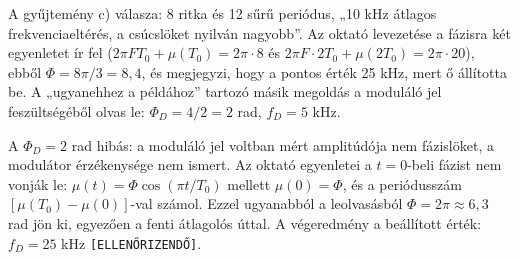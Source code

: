 \begin{tipp}
A gyűjtemény c) válasza: 8 ritka és 12 sűrű periódus, „10 kHz átlagos frekvenciaeltérés, a csúcslöket nyilván nagyobb”. Az oktató levezetése a fázisra két egyenletet ír fel ($2\pi FT_0+\mu(T_0)=2\pi\cdot8$ és $2\pi F\cdot2T_0+\mu(2T_0)=2\pi\cdot20$), ebből $\Phi=8\pi/3=8{,}4$, és megjegyzi, hogy a pontos érték 25 kHz, mert ő állította be. A „ugyanehhez a példához” tartozó másik megoldás a moduláló jel feszültségéből olvas le: $\Phi_D=4/2=2$ rad, $f_D=5$ kHz.
\end{tipp}
\begin{figyelem}[Javítás]
A $\Phi_D=2$ rad hibás: a moduláló jel voltban mért amplitúdója nem fázislöket, a modulátor érzékenysége nem ismert. Az oktató egyenletei a $t=0$-beli fázist nem vonják le: $\mu(t)=\Phi\cos(\pi t/T_0)$ mellett $\mu(0)=\Phi$, és a periódusszám $[\mu(T_0)-\mu(0)]$-val számol. Ezzel ugyanabból a leolvasásból $\Phi=2\pi\approx6{,}3$ rad jön ki, egyezően a fenti átlagolós úttal. A végeredmény a beállított érték: $f_D=25$ kHz \texttt{[ELLENŐRIZENDŐ]}.
\end{figyelem}
\begin{eredmeny}

\begin{center}\end{center}
\end{eredmeny}


